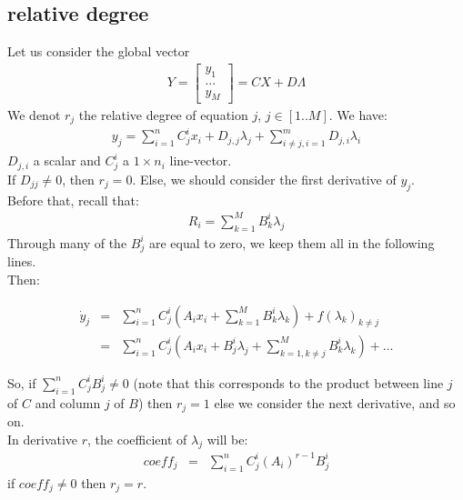 \documentclass[10pt]{report}
\begin{document}
\subsection{relative degree}
Let us consider the global vector 
\begin{eqnarray}
Y =\left[\begin{array}{c} 
y_1 \\
...  \\
y_M
\end{array}\right] = CX + D\Lambda
\end{eqnarray}
We denot $r_j$ the relative degree of equation $j$, $j\in [1..M]$. 
We have:
\begin{eqnarray}
y_j = \displaystyle{\sum_{i=1}^n C_j^i x_i +D_{j,j}\lambda_j + \sum_{i\neq j, i=1}^m D_{j,i} \lambda_i } 
\end{eqnarray}
$D_{j,i}$ a scalar and $C_j^i$ a $1 \times n_i$ line-vector. \\
If $D_{jj} \neq 0$, then $r_j=0$. Else, we should consider the first derivative of $y_j$. \\
Before that, recall that: 
\begin{eqnarray}
R_i = \displaystyle{\sum_{k=1}^M B_k^i \lambda_j}
\end{eqnarray}
Through many of the $B_j^i$ are equal to zero, we keep them all in the following lines. \\
Then:

\begin{eqnarray}
\dot y_j &=& \displaystyle{\sum_{i=1}^n C_j^i (A_i x_i +  \sum_{k=1}^M B_k^i \lambda_k  ) + f(\lambda_k)_{k\neq j}} \\
&=& \displaystyle{\sum_{i=1}^n C_j^i (A_i x_i + B_j^i \lambda_j + \sum_{k=1,k\neq j}^M B_k^i \lambda_k  ) + \ldots}
\end{eqnarray}

So, if $\displaystyle{\sum_{i=1}^n C_j^i B_j^i} \neq 0$ (note that this corresponds to the product between line $j$ of $C$ and column $j$ of $B$) 
then $r_j=1$ else we consider the next derivative, and so on.  \\
In derivative $r$, the coefficient of $\lambda_j$ will be:
\begin{eqnarray}
coeff_j&=& \displaystyle{\sum_{i=1}^n C_j^i (A_i)^{r-1} B_j^i }
\end{eqnarray}
if $coeff_j\neq 0$ then $r_j = r$. 
\end{document}
